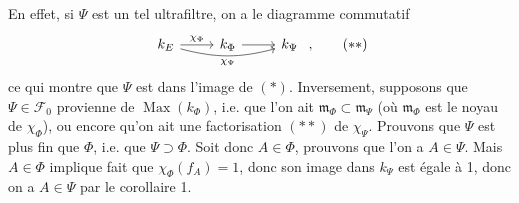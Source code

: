 En effet, si $\Psi$ est un tel ultrafiltre, on
a le diagramme commutatif
\[
\begin{tikzcd}
k_E \arrow[r, "\chi_\Phi"] \arrow[rr, bend right=15, "\chi_\Psi"'] & k_\Phi \arrow[r] & k_\Psi
\end{tikzcd}\ , \tag*{$(**)$}
\]
ce qui montre que $\Psi$ est dans l'image de $(*)$. Inversement, supposons que $\Psi\in\mathcal{F}_0$ provienne de $\operatorname{Max}(k_\Phi)$, i.e. que l'on ait $\mathfrak{m}_\Phi\subset\mathfrak{m}_\Psi$ (où $\mathfrak{m}_\Phi$ est le noyau de $\chi_\Phi$), ou encore qu'on ait une factorisation $(**)$ de $\chi_\Psi$. Prouvons que $\Psi$ est plus fin que $\Phi$, i.e. que $\Psi\supset\Phi$. Soit donc $A\in\Phi$, prouvons que l'on a $A\in\Psi$. Mais $A\in\Phi$ implique fait que $\chi_\Phi(f_A)=1$, donc son image dans $k_\Psi$ est égale à 1, donc on a $A\in\Psi$ par le corollaire 1.

